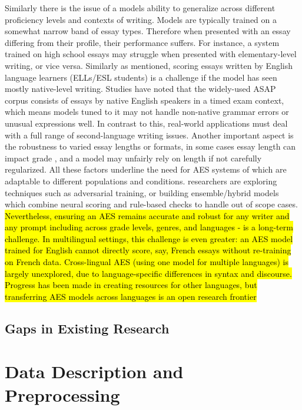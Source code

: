 \documentclass[8pt]{report}
\begin{document}
Similarly there is the issue of a models ability to generalize across different proficiency levels and contexts of writing. Models are typically trained on a somewhat narrow band of essay types. Therefore when presented with an essay differing from 
their profile, their performance suffers. For instance, a system trained on high school essays may struggle when presented with elementary-level writing, or vice versa.  Similarly as mentioned, scoring essays written by English language learners 
(ELLs/ESL students) is a challenge if the model has seen mostly native-level writing. Studies have noted that the widely-used ASAP corpus consists of essays by native English speakers in a timed exam context, which means models tuned to it may not 
handle non-native grammar errors or unusual expressions well. In contrast to this, real-world applications must deal with a full range of second-language writing issues. Another important aspect is the robustness to varied essay lengths or formats, 
in some cases essay length can impact grade \parencite{Sgengjie2024acl}, and a model may unfairly rely on length if not carefully regularized. All these factors underline the need for AES systems of which are adaptable to different populations and conditions. 
researchers are exploring techniques such as adversarial training, or building ensemble/hybrid models which combine neural scoring and rule-based checks to handle out of scope cases. \hl{Nevertheless, ensuring an AES remains accurate and robust for any writer 
and any prompt including across grade levels, genres, and languages - is a long-term challenge. In multilingual settings, this challenge is even greater: an AES model trained for English cannot directly score, say, French essays without re-training on French 
data. Cross-lingual AES (using one model for multiple languages) is largely unexplored, due to language-specific differences in syntax and discourse. Progress has been made in creating resources for other languages, but transferring AES models across languages 
is an open research frontier}
\section{Gaps in Existing Research}


\chapter{Data Description and Preprocessing}
\end{document}
